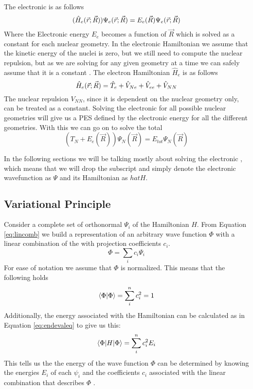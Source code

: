 \documentclass[../master_thesis.tex]{subfiles}
\begin{document}
The electronic \SE is as follows
\begin{equation}
    (\hat{H}_e(\vec{r}; \vec{R}) )\Psi_e(\vec{r};\vec{R}) = E_e(\vec{R})\Psi_e(\vec{r};\vec{R})
\end{equation}
Where the Electronic energy $E_e$ becomes a function of $\vec{R}$ which is solved as
a constant for each nuclear geometry. In the electronic Hamiltonian
we assume that the kinetic energy of the nuclei is zero, but we still need to
compute the nuclear repulsion, but as we are solving for any given geometry at a time
we can safely assume that it is a constant \cite{Cramer:2004}. The electron
Hamiltonian $\hat{H}_e$ is as follows
\begin{equation}\label{eq:elhamiltonian}
    \hat{H}_e(\vec{r}; \vec{R}) = \hat{T}_e + \hat{V}_{Ne} + \hat{V}_{ee}  + \hat{V}_{NN}
\end{equation}
The nuclear repulsion $V_{NN}$, since it is dependent on the nuclear geometry only,
can be treated as a constant.
Solving the electronic \SE for all possible nuclear geometries will give us
a \ac{PES} defined by the electronic energy for all the different geometries.
With this we can go on to solve the total \SE \cite{Jensen:2017}
\begin{equation}
  (T_N + E_e(\vec{R}))\Psi_N(\vec{R}) = E_{tot}\Psi_N(\vec{R})
\end{equation}

In the following sections we will be talking mostly about solving the electronic \SE,
 which means that we will drop the subscript and simply denote the electronic
wavefunction as $\Psi$ and its Hamiltonian as $hat{H}$.

\subsection{Variational Principle}
Consider a complete set of orthonormal \eifuncs $ \Psi_i$  of the
Hamiltonian $H$. From Equation \ref{eq:lincomb} we build a representation of an
arbitrary wave function $\Phi$ with a linear combination of the \eifuncs with
projection coefficients $c_i$.
\begin{equation}
  \Phi = \sum\limits_ic_i\Psi_i
\end{equation}
For ease of notation we assume that  $\Phi$ is normalized. This means that the
following holds
\begin{equation}
  \braket{\Phi|\Phi} = \sum\limits_i^nc_i^2 = 1
\end{equation}
 Additionally, the energy associated with the Hamiltonian can
be calculated as in Equation \ref{eq:endevaleq} to give us this:
\begin{equation}
  \braket{\Phi|H|\Phi} = \sum\limits_i^nc_i^2E_i\label{eq:genenerg}
\end{equation}
This tells us the the energy of the wave function $\Phi$ can be determined by
knowing the energies $E_i$ of each \eifunc $\psi_i$ and the coefficients
$c_i$ associated with the linear combination that describes $\Phi$
\cite{Cramer:2004}.
\end{document}
